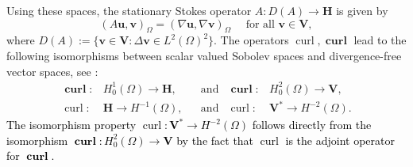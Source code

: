 \documentclass{m2an}
\newcommand{\1}{\mathds{1}}
\newcommand{\uu}{\mathbf{u}}
\newcommand{\vv}{\mathbf{v}}
\newcommand{\Om}{\Omega}
\newcommand{\revB}[1]{\textcolor{black}{#1}}
\newcommand{\curl}{\operatorname{curl}}
\newcommand{\Curl}{\operatorname{\mathbf{curl}}}
\newcommand{\Oprod}[1]{\left(#1\right)_{\Omega}}
\newcommand{\V}{\mathbf{V}}
\renewcommand{\H}{\mathbf{H}}
\theoremstyle{definition}
\begin{document}
    Using these spaces, the stationary Stokes operator $A\colon D(A) \to \H$ is given by 
    \begin{equation}\label{eq:def_stokes_operator}
        \Oprod{A \uu,\vv} = \Oprod{\nabla \uu,\nabla \vv} \quad \text{ for all } \vv \in \V,
    \end{equation}
    where $D(A) := \{\vv \in \V: \Delta \vv \in L^2(\Om)^2\}$.
    The operators $\curl, \Curl$ lead to the following isomorphisms between scalar valued Sobolev spaces and 
    divergence-free vector spaces, see \cite[Lemma 2]{GuermondJL_QuartapelleL_1994}:
    \begin{align}
        \Curl\colon& H^1_0(\Om) \to \H, && \text{and}& \Curl\colon& H^2_0(\Om) \to \V,\label{eq:Curl_isom}\\ 
        \curl\colon& \H \to H^{-1}(\Om), && \text{and} & \curl\colon& \V^* \to H^{-2}(\Om).\label{eq:curl_isom}
    \end{align}
    \revB{The isomorphism property $\curl\colon \V^* \to H^{-2}(\Om)$ follows directly from the isomorphism $\Curl\colon H^2_0(\Om) \to \V$ by the fact that $\curl$ is the adjoint operator for $\Curl$.}
    
\end{document}
